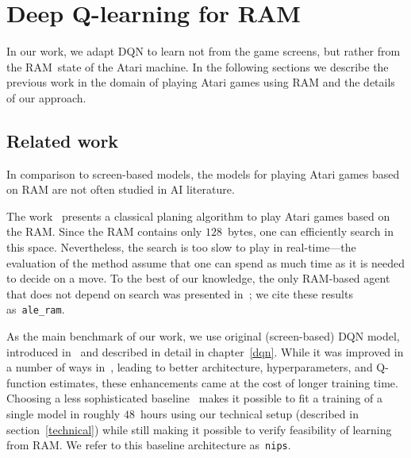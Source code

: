 \chapter{Deep Q-learning for RAM}\label{dqn-ram}
In our work, we adapt DQN to learn not from the game screens, but rather from the RAM~state of the Atari machine. In the following sections we describe the previous work in the domain of playing Atari games using RAM and the details of our approach.

\section{Related work}
In comparison to screen-based models, the models for playing Atari games based on RAM are not often studied in AI literature.

The work~\cite{nir} presents a classical planing algorithm to play Atari games based on the RAM. Since the RAM contains only $128$~bytes, one can efficiently search in this space. Nevertheless, the search is too slow to play in real-time---the evaluation of the method assume that one can spend as much time as it is needed to decide on a move. To the best of our knowledge, the only RAM-based agent that does not depend on search was presented in~\cite{ale}; we cite these results as~\texttt{ale\_ram}.

As the main benchmark of our work, we use original (screen-based) DQN model, introduced in~\cite{nips-dqn} and described in detail in chapter~\ref{dqn}. While it was improved in a number of ways in~\cite{nature-dqn, double-dqn, shallow-dqn, duelling-dqn}, leading to better architecture, hyperparameters, and Q-function estimates, these enhancements came at the cost of longer training time. Choosing a less sophisticated baseline~\cite{nips-dqn} makes it possible to fit a training of a single model in roughly $48$~hours using our technical setup (described in section~\ref{technical}) while still making it possible to verify feasibility of learning from RAM. We refer to this baseline architecture as~\texttt{nips}.

